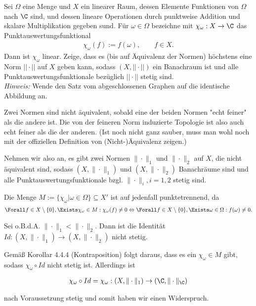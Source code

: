 \begin{exercise}
Sei $\Omega$ eine Menge und $X$ ein linearer Raum, dessen Elemente Funktionen von
$\Omega$ nach $\C$ sind, und dessen lineare Operationen durch punktweise Addition
und skalare Multiplikation gegeben sund. Für $\omega \in \Omega$ bezeichne mit
$\chi_{\omega}: X \rightarrow \C$ das Punktauswertungsfunktional
\begin{align*}
  \chi_{\omega}(f) := f(\omega), \qquad f \in X.
\end{align*}
Dann ist $\chi_{\omega}$ linear. Zeige, dass es (bis auf Äquivalenz der Normen)
höchstens eine Norm $||\cdot||$ auf $X$ geben kann, sodass $(X,||\cdot||)$ ein
Banachraum ist und alle Punktauswertungsfunktionale bezüglich $||\cdot||$ stetig sind. \\
\textit{Hinweis:} Wende den Satz vom abgeschlossenen Graphen auf die identische Abbildung an.
\end{exercise}
\begin{solution}
Zwei Normen sind nicht äquivalent, sobald eine der beiden Normen "echt feiner" als die andere ist. Die von der feineren Norm induzierte Topologie ist also auch echt feiner als die der anderen. (Ist noch nicht ganz sauber, muss man wohl noch mit der offiziellen Definition von (Nicht-)Äquivalenz zeigen.)
\newline

Nehmen wir also an, es gibt zwei Normen $\|\cdot \|_1$ und $\|\cdot \|_2$ auf $X$, die nicht äquivalent sind, sodass $(X,\|\cdot \|_1)$ und $(X,\|\cdot \|_2)$ Banachräume sind und alle Punktauswertungsfunktionale bzgl. $\|\cdot \|_i, i = 1,2$ stetig sind.

Die Menge $M := \{\chi_\omega | \omega \in \Omega\} \subseteq X'$ ist auf jedenfall punktetrennend, da
\begin{align*}
  \Forall f \in X \setminus \{0\}, \Exists \chi_\omega \in M: \chi_\omega(f) \neq 0 \Leftrightarrow \Forall f \in X \setminus \{0\}, \Exists \omega \in \Omega: f(\omega) \neq 0 .
\end{align*}

Sei o.B.d.A. $\|\cdot \|_1 < \|\cdot \|_2$. Dann ist die Identität $Id:(X,\|\cdot \|_1) \to (X,\|\cdot \|_2)$ nicht stetig.

Gemäß Korollar 4.4.4 (Kontraposition) folgt daraus, dass es ein $\chi_\omega \in M$ gibt, sodass $\chi_\omega \circ Id$ nicht stetig ist. Allerdings ist

\begin{align*}
  \chi_\omega \circ Id = \chi_\omega: (X,\|\cdot \|_1) \to (\C, \|\cdot \|_\C)
\end{align*}

nach Voraussetzung stetig und somit haben wir einen Widerspruch.

\end{solution}
